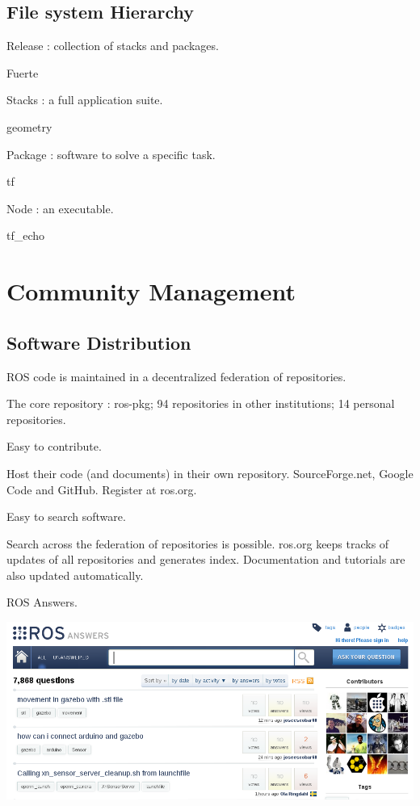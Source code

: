 \documentclass[a4paper, 10pt, conference]{ieeeconf}       %
\begin{document}
\subsection{File system Hierarchy}


   Release : collection of stacks and packages.
  
     Fuerte
  
   Stacks : a full application suite.
  
     geometry
  
   Package : software to solve a specific task.
  
     tf
  
   Node : an executable.
  
     tf\_echo
  




\section{Community Management}

\subsection{Software Distribution}


   ROS code is maintained in a decentralized federation of repositories.
  
     The core repository : ros-pkg;
     94 repositories in other institutions;
     14 personal repositories.
  
   Easy to contribute.
  
     Host their code (and documents) in their own repository.
     SourceForge.net, Google Code and GitHub.
     Register at ros.org.
  
   Easy to search software.
  
     Search across the federation of repositories is possible.
     ros.org keeps tracks of updates of all repositories and generates index.
     Documentation and tutorials are also updated automatically.
  







   ROS Answers.

\begin{center}
  \includegraphics[width=\textwidth]{ros_answers}
\end{center}
\end{document}
